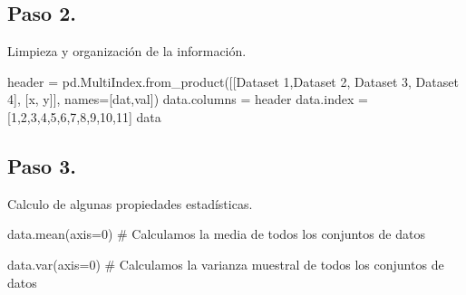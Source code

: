 \documentclass[
  letterpaper,
  DIV=11,
  numbers=noendperiod]{scrreprt}
\newenvironment{Shaded}{\begin{snugshade}}{\end{snugshade}}
\newcommand{\CommentTok}[1]{\textcolor[rgb]{0.37,0.37,0.37}{#1}}
\newcommand{\DecValTok}[1]{\textcolor[rgb]{0.68,0.00,0.00}{#1}}
\newcommand{\NormalTok}[1]{\textcolor[rgb]{0.00,0.23,0.31}{#1}}
\newcommand{\OperatorTok}[1]{\textcolor[rgb]{0.37,0.37,0.37}{#1}}
\newcommand{\StringTok}[1]{\textcolor[rgb]{0.13,0.47,0.30}{#1}}
\begin{document}
\subsection{Paso 2.}\label{paso-2.}

Limpieza y organización de la información.

\begin{Shaded}
\begin{Highlighting}[]
\NormalTok{header }\OperatorTok{=}\NormalTok{ pd.MultiIndex.from\_product([[}\StringTok{\textquotesingle{}Dataset 1\textquotesingle{}}\NormalTok{,}\StringTok{\textquotesingle{}Dataset 2\textquotesingle{}}\NormalTok{, }
                                      \StringTok{\textquotesingle{}Dataset 3\textquotesingle{}}\NormalTok{, }\StringTok{\textquotesingle{}Dataset 4\textquotesingle{}}\NormalTok{],}
\NormalTok{                                     [}\StringTok{\textquotesingle{}x\textquotesingle{}}\NormalTok{, }\StringTok{\textquotesingle{}y\textquotesingle{}}\NormalTok{]],}
\NormalTok{                                    names}\OperatorTok{=}\NormalTok{[}\StringTok{\textquotesingle{}dat\textquotesingle{}}\NormalTok{,}\StringTok{\textquotesingle{}val\textquotesingle{}}\NormalTok{])}
\NormalTok{data.columns }\OperatorTok{=}\NormalTok{ header}
\NormalTok{data.index }\OperatorTok{=}\NormalTok{ [}\DecValTok{1}\NormalTok{,}\DecValTok{2}\NormalTok{,}\DecValTok{3}\NormalTok{,}\DecValTok{4}\NormalTok{,}\DecValTok{5}\NormalTok{,}\DecValTok{6}\NormalTok{,}\DecValTok{7}\NormalTok{,}\DecValTok{8}\NormalTok{,}\DecValTok{9}\NormalTok{,}\DecValTok{10}\NormalTok{,}\DecValTok{11}\NormalTok{]}
\NormalTok{data}
\end{Highlighting}
\end{Shaded}

\subsection{Paso 3.}\label{paso-3.}

Calculo de algunas propiedades estadísticas.

\begin{Shaded}
\begin{Highlighting}[]
\NormalTok{data.mean(axis}\OperatorTok{=}\DecValTok{0}\NormalTok{) }\CommentTok{\# Calculamos la media de todos los conjuntos de datos}
\end{Highlighting}
\end{Shaded}

\begin{Shaded}
\begin{Highlighting}[]
\NormalTok{data.var(axis}\OperatorTok{=}\DecValTok{0}\NormalTok{) }\CommentTok{\# Calculamos la varianza muestral de todos los conjuntos de datos}
\end{Highlighting}
\end{Shaded}
\end{document}
